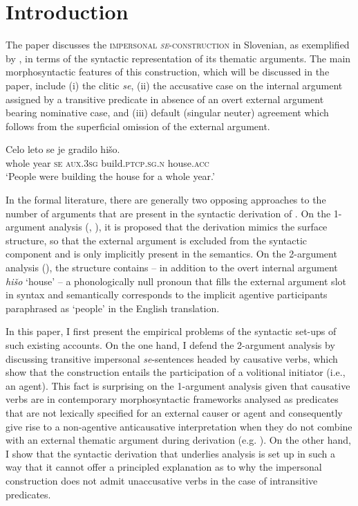 \documentclass[output=paper,
modfonts,nonflat,
newtxmath
]{langsci/langscibook}
\author{Jakob Lenardič\affiliation{University of Ljubljana}
}
\begin{document}
\maketitle

\section{Introduction} 
The paper discusses the \textsc{impersonal \textit{se}-construction} in Slovenian, as exemplified by , in terms of the syntactic representation of its thematic arguments. The main morphosyntactic features of this construction, which will be discussed in the paper, include (i) the clitic \textit{se}, (ii) the accusative case on the internal argument assigned by a transitive predicate in absence of an overt external argument bearing nominative case, and (iii) default (singular neuter) agreement which follows from the superficial omission of the external argument.

\ea  \label{ex:lenardic:1}
\gll Celo leto se je gradilo hišo.\\
   whole year \textsc{se} \textsc{aux}.\textsc{3sg} build.\textsc{ptcp.sg.n} house.\textsc{acc}\\
\glt `People were building the house for a whole year.'
\z

\noindent In the formal literature, there are generally two opposing approaches to the number of arguments that are present in the syntactic derivation of . On the 1-argument analysis (\citealt{marelj2004}, \citealt{grahek2008}), it is proposed that the derivation mimics the surface structure, so that the external argument is excluded from the syntactic component and is only implicitly present in the semantics. On the 2-argument analysis (\citealt{riverosheppard2003}), the structure contains – in addition to the overt internal argument \textit{hišo} `house' – a phonologically null pronoun that fills the external argument slot in syntax and semantically corresponds to the implicit agentive participants paraphrased as `people' in the English translation. \par

In this paper, I first present the empirical problems of the syntactic set-ups of such existing accounts. On the one hand, I defend the 2-argument analysis by discussing transitive impersonal \textit{se}-sentences headed by causative verbs, which show that the construction entails the participation of a volitional initiator (i.e., an agent). This fact is surprising on the 1-argument analysis given that causative verbs are in contemporary morphosyntactic frameworks analysed as predicates that are not lexically specified for an external causer or agent and consequently give rise to a non-agentive anticausative interpretation when they do not combine with an external thematic argument during derivation (e.g. \citealt{alexiadouet2015}). On the other hand, I show that the syntactic derivation that underlies  analysis is set up in such a way that it cannot offer a principled explanation as to why the impersonal construction does not admit unaccusative verbs in the case of intransitive predicates. \par
\end{document}
